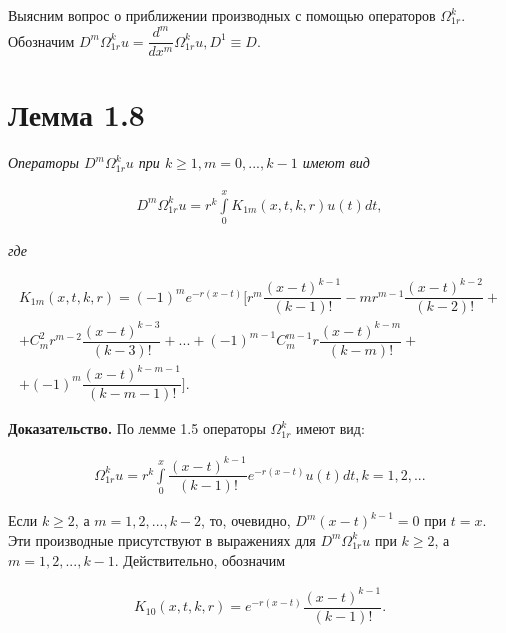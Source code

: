 Выясним вопрос о приближении производных с помощью операторов $ \Omega_{1r}^k $. Обозначим $ D^m\Omega_{1r}^ku = \dfrac{d^m}{dx^m}\Omega_{1r}^ku, D^1 \equiv D $.

\section{Лемма 1.8}
\label{lemma1.8}

\textit{Операторы $ D^m\Omega_{1r}^ku $ при $ k \geq 1, m = 0,...,k-1 $ имеют вид}

\begin{equation}
\begin{array}{c}

D^m\Omega_{1r}^ku = r^k\int\limits_0^x K_{1m}(x,t,k,r)u(t)dt,

\end{array}
\end{equation}

\textit{где}

\begin{equation}
\begin{array}{c}

K_{1m}(x,t,k,r) = (-1)^me^{-r(x-t)} \biggl[r^m\dfrac{(x-t)^{k-1}}{(k-1)!} - mr^{m-1}\dfrac{(x-t)^{k-2}}{(k-2)!} + \\ + C_m^2r^{m-2}\dfrac{(x-t)^{k-3}}{(k-3)!} + ... + (-1)^{m-1}C_m^{m-1}r\dfrac{(x-t)^{k-m}}{(k-m)!} + \\ 
+ (-1)^m\dfrac{(x-t)^{k-m-1}}{(k-m-1)!}\biggr].

\end{array}
\end{equation}

\textbf{Доказательство.} По лемме 1.5 операторы $ \Omega_{1r}^k $ имеют вид:

\begin{equation}
\begin{array}{c}
\nonumber

\Omega_{1r}^ku = r^k \int\limits_0^x \dfrac{(x-t)^{k-1}}{(k-1)!}e^{-r(x-t)}u(t)dt, k = 1,2,...

\end{array}
\end{equation}

Если $ k \geq 2 $, а $ m = 1,2,...,k-2 $, то, очевидно, $ D^m(x-t)^{k-1} = 0 $ при $ t = x $. Эти производные присутствуют в выражениях для $ D^m\Omega_{1r}^ku $ при $ k \geq 2 $, а $ m = 1,2,...,k-1 $. Действительно, обозначим

\begin{equation}
\begin{array}{c}

K_{10}(x,t,k,r) = e^{-r(x-t)}\dfrac{(x-t)^{k-1}}{(k-1)!}.

\end{array}
\end{equation}

